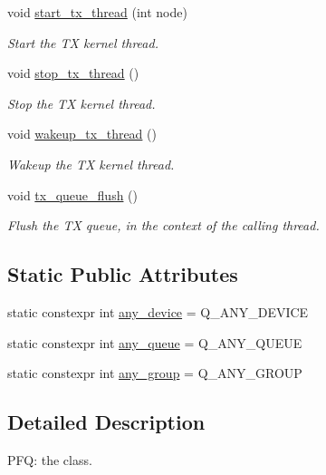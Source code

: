 \begin{DoxyCompactItemize}
void \hyperlink{classnet_1_1pfq_a90c4ea400b987ae1f75fb1c1574fefa5}{start\+\_\+tx\+\_\+thread} (int node)
\begin{DoxyCompactList}\small\item\em Start the T\+X kernel thread. \end{DoxyCompactList}\item 
void \hyperlink{classnet_1_1pfq_ab45272fa6c3b0ccaaf9b7c6049493e7f}{stop\+\_\+tx\+\_\+thread} ()
\begin{DoxyCompactList}\small\item\em Stop the T\+X kernel thread. \end{DoxyCompactList}\item 
void \hyperlink{classnet_1_1pfq_a0f7e48a2b3a175351bc648704de4574c}{wakeup\+\_\+tx\+\_\+thread} ()
\begin{DoxyCompactList}\small\item\em Wakeup the T\+X kernel thread. \end{DoxyCompactList}\item 
void \hyperlink{classnet_1_1pfq_ac62937a932e1af8669f72ee165366397}{tx\+\_\+queue\+\_\+flush} ()
\begin{DoxyCompactList}\small\item\em Flush the T\+X queue, in the context of the calling thread. \end{DoxyCompactList}\end{DoxyCompactItemize}
\subsection*{Static Public Attributes}
\begin{DoxyCompactItemize}
\item 
static constexpr int \hyperlink{classnet_1_1pfq_a8ecbb4cb4e632b85865a6c77fd4a6a45}{any\+\_\+device} = Q\+\_\+\+A\+N\+Y\+\_\+\+D\+E\+V\+I\+C\+E
\item 
static constexpr int \hyperlink{classnet_1_1pfq_a0d4eca6d0925b7c49365675c9cf9385c}{any\+\_\+queue} = Q\+\_\+\+A\+N\+Y\+\_\+\+Q\+U\+E\+U\+E
\item 
static constexpr int \hyperlink{classnet_1_1pfq_a3aa94e5b77640a4db592893fa9220e81}{any\+\_\+group} = Q\+\_\+\+A\+N\+Y\+\_\+\+G\+R\+O\+U\+P
\end{DoxyCompactItemize}


\subsection{Detailed Description}
P\+F\+Q\+: the class. 

